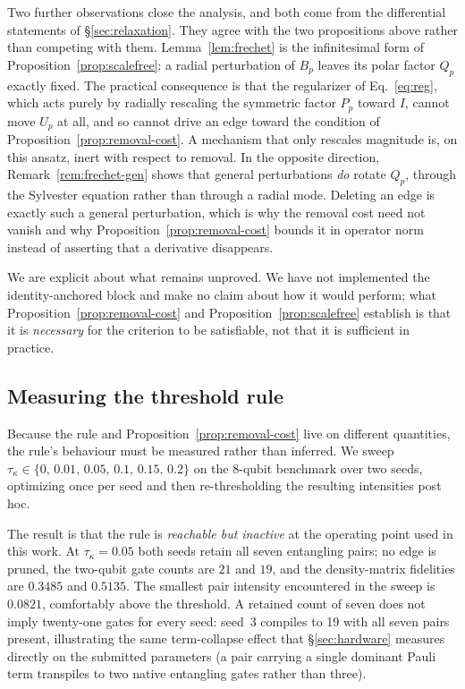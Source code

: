 \documentclass[twocolumn,aps,prl,superscriptaddress,showkeys]{revtex4-2}
\theoremstyle{plain}
\theoremstyle{definition}
\begin{document}
Two further observations close the analysis, and both come from the differential statements of \S\ref{sec:relaxation}. They agree with the two propositions above rather than competing with them. Lemma~\ref{lem:frechet} is the infinitesimal form of Proposition~\ref{prop:scalefree}: a radial perturbation of $B_p$ leaves its polar factor $Q_p$ exactly fixed. The practical consequence is that the regularizer of Eq.~\eqref{eq:reg}, which acts purely by radially rescaling the symmetric factor $P_p$ toward $I$, cannot move $U_p$ at all, and so cannot drive an edge toward the condition of Proposition~\ref{prop:removal-cost}. A mechanism that only rescales magnitude is, on this ansatz, inert with respect to removal. In the opposite direction, Remark~\ref{rem:frechet-gen} shows that general perturbations \emph{do} rotate $Q_p$, through the Sylvester equation rather than through a radial mode. Deleting an edge is exactly such a general perturbation, which is why the removal cost need not vanish and why Proposition~\ref{prop:removal-cost} bounds it in operator norm instead of asserting that a derivative disappears.

We are explicit about what remains unproved. We have not implemented the identity-anchored block and make no claim about how it would perform; what Proposition~\ref{prop:removal-cost} and Proposition~\ref{prop:scalefree} establish is that it is \emph{necessary} for the criterion to be satisfiable, not that it is sufficient in practice.

\subsection{Measuring the threshold rule}
\label{sec:pruning}

Because the rule and Proposition~\ref{prop:removal-cost} live on different quantities, the rule's behaviour must be measured rather than inferred. We sweep $\tau_\kappa\in\{0,\,0.01,\,0.05,\,0.1,\,0.15,\,0.2\}$ on the 8-qubit benchmark over two seeds, optimizing once per seed and then re-thresholding the resulting intensities post hoc.

The result is that the rule is \emph{reachable but inactive} at the operating point used in this work. At $\tau_\kappa=0.05$ both seeds retain all seven entangling pairs; no edge is pruned, the two-qubit gate counts are $21$ and $19$, and the density-matrix fidelities are $0.3485$ and $0.5135$. The smallest pair intensity encountered in the sweep is $0.0821$, comfortably above the threshold. A retained count of seven does not imply twenty-one gates for every seed: seed~3 compiles to 19 with all seven pairs present, illustrating the same term-collapse effect that \S\ref{sec:hardware} measures directly on the submitted parameters (a pair carrying a single dominant Pauli term transpiles to two native entangling gates rather than three).
\end{document}
